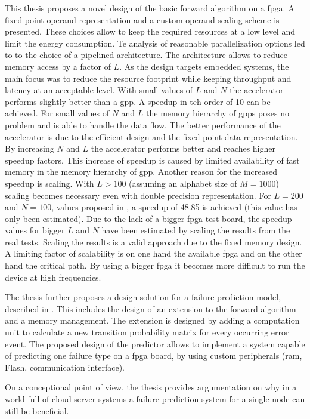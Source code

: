 \documentclass[mscthesis]{usiinfthesis}
\begin{document}
This thesis proposes a novel design of the basic forward algorithm on
a \gls{fpga}. A fixed point operand representation and a custom operand scaling
scheme is presented. These choices allow to keep the required resources at
a low level and limit the energy consumption. Te analysis of reasonable
parallelization options led to to the choice of a pipelined architecture. The
architecture allows to reduce memory access by a factor of $L$. As the design
targets embedded systems, the main focus was to reduce the resource footprint
while keeping throughput and latency at an acceptable level. With small values
of $L$ and $N$ the accelerator performs slightly better than a \gls{gpp}.
A speedup in teh order of 10 can be achieved. For small values of $N$ and $L$
the memory hierarchy of \glspl{gpp} poses no problem and is able to handle the
data flow. The better performance of the accelerator is due to the efficient
design and the fixed-point data representation. By increasing $N$ and $L$ the
accelerator performs better and reaches higher speedup factors. This increase
of speedup is caused by limited availability of fast memory in the memory
hierarchy of \gls{gpp}. Another reason for the increased speedup is scaling.
With $L > 100$ (assuming an alphabet size of $M=1000$) scaling becomes necessary 
even with double precision representation. For $L=200$ and $N=100$, values
proposed in \cite{salfner08}, a speedup of 48.85 is achieved (this value has
only been estimated).
Due to the lack of a bigger \gls{fpga} test board, the speedup values for
bigger $L$ and $N$ have been estimated by scaling the results from the real
tests. Scaling the results is a valid approach due to the fixed memory design.
A limiting factor of scalability is on one hand the available \gls{fpga} and
on the other hand the critical path. By using a bigger \gls{fpga} it becomes
more difficult to run the device at high frequencies.

The thesis further proposes a design solution for a failure prediction model,
described in \cite{salfner08}. This includes the design of an extension to the
forward algorithm and a memory management. The extension is designed by adding
a computation unit to calculate a new transition probability matrix for every
occurring error event. The proposed design of the predictor allows to implement
a system capable of predicting one failure type on a \gls{fpga} board, by using
custom peripherals (\gls{ram}, Flash, communication interface).

On a conceptional point of view, the thesis provides argumentation on why in
a world full of cloud server systems a failure prediction system for a single
node can still be beneficial.
\end{document}
